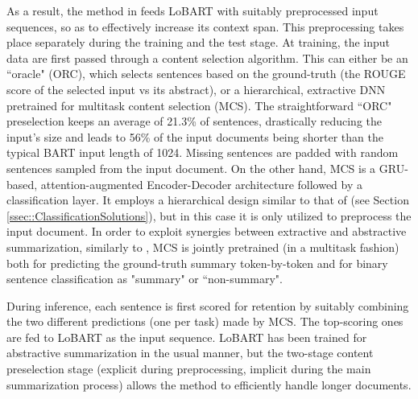 \documentclass[preprint,review,10pt]{elsarticle}
\begin{document}
	As a result, the method in \cite{gales} feeds LoBART with suitably preprocessed input sequences, so as to effectively increase its context span. This preprocessing takes place separately during the training and the test stage. At training, the input data are first passed through a content selection algorithm. This can either be an ``oracle" (ORC), which selects sentences based on the ground-truth (the ROUGE score of the selected input vs its abstract), or a hierarchical, extractive DNN pretrained for multitask content selection (MCS). The straightforward ``ORC" preselection keeps an average of 21.3\% of sentences, drastically reducing the input's size and leads to 56\% of the input documents being shorter than the typical BART input length of 1024. Missing sentences are padded with random sentences sampled from the input document. On the other hand, MCS is a GRU-based, attention-augmented Encoder-Decoder architecture followed by a classification layer. It employs a hierarchical design similar to that of \cite{liu} (see Section \ref{ssec::ClassificationSolutions}), but in this case it is only utilized to preprocess the input document. In order to exploit synergies between extractive and abstractive summarization, similarly to \cite{lapata_bert}, MCS is jointly pretrained (in a multitask fashion) both for predicting the ground-truth summary token-by-token and for binary sentence classification as "summary" or ``non-summary".
	
	During inference, each sentence is first scored for retention by suitably combining the two different predictions (one per task) made by MCS. The top-scoring ones are fed to LoBART as the input sequence. LoBART has been trained for abstractive summarization in the usual manner, but the two-stage content preselection stage (explicit during preprocessing, implicit during the main summarization process) allows the method to efficiently handle longer documents.
	
	
	
	
\end{document}
